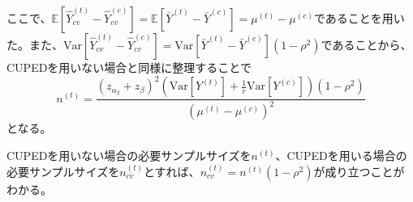 ここで、$\mathbb{E}[\hat{Y}_{cv}^{(t)} - \hat{Y}_{cv}^{(c)}] = \mathbb{E}[\bar{Y}^{(t)} - \bar{Y}^{(c)}] = \mu^{(t)} - \mu^{(c)}$であることを用いた。また、$\text{Var}[\hat{Y}_{cv}^{(t)} - \hat{Y}_{cv}^{(c)}] = \text{Var}[\bar{Y}^{(t)} - \bar{Y}^{(c)}](1 - \rho^{2})$であることから、CUPEDを用いない場合と同様に整理することで
\begin{equation}
    n^{(t)} = \frac{(z_{\alpha_2} + z_{\beta})^{2}\left(\text{Var}[Y^{(t)}] + \frac{1}{r}\text{Var}[Y^{(c)}]\right)(1 - \rho^{2})}{(\mu^{(t)} - \mu^{(c)})^{2}}
\end{equation}
となる。

CUPEDを用いない場合の必要サンプルサイズを$n^{(t)}$、CUPEDを用いる場合の必要サンプルサイズを$n_{cv}^{(t)}$とすれば、$n_{cv}^{(t)} = n^{(t)}(1 - \rho^{2})$が成り立つことがわかる。





